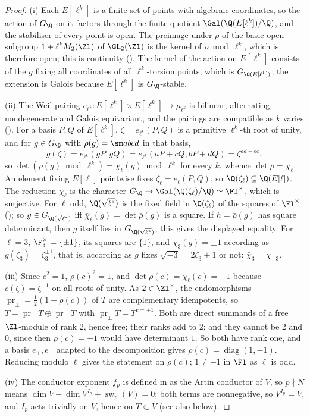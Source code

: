 \begin{proof}
(i) Each $E[\ell^k]$ is a finite set of points with algebraic coordinates, so the action of $G_\Q$ on it factors through the finite quotient
$\Gal(\Q(E[\ell^k])/\Q)$, and the stabiliser of every point is open. The preimage under $\rho$ of the basic open subgroup $1+\ell^kM_2(\Zl)$ of $\GL_2(\Zl)$ is the kernel of $\rho\bmod\ell^k$, which is
therefore open; this is continuity (). The kernel of the action on
$E[\ell^k]$ consists of the $g$ fixing all coordinates of all $\ell^k$-torsion points, which is $G_{\Q(E[\ell^k])}$; the extension is Galois because
$E[\ell^k]$ is $G_\Q$-stable.

(ii) The Weil pairing $e_{\ell^k}\colon E[\ell^k]\times E[\ell^k]\to\mu_{\ell^k}$ is bilinear, alternating, nondegenerate and Galois equivariant, and the
pairings are compatible as $k$ varies (). For a basis $P,Q$ of $E[\ell^k]$, $\zeta=e_{\ell^k}(P,Q)$ is a primitive $\ell^k$-th root
of unity, and for $g\in G_\Q$ with $\rho(g)=\sm abcd$ in that basis,
\[
g(\zeta)=e_{\ell^k}(gP,gQ)=e_{\ell^k}(aP+cQ,bP+dQ)=\zeta^{ad-bc},
\]
so $\det(\rho(g)\bmod\ell^k)=\chi_\ell(g)\bmod\ell^k$ for every $k$, whence $\det\rho=\chi_\ell$. An element fixing $E[\ell]$ pointwise fixes $\zeta_\ell=e_\ell(P,Q)$,
so $\Q(\zeta_\ell)\subseteq\Q(E[\ell])$. The reduction $\bar\chi_\ell$ is the character $G_\Q\to\Gal(\Q(\zeta_\ell)/\Q)\simeq\Fl^\times$, which is surjective. For $\ell$
odd, $\Q(\sqrt{\ell^*})$ is the fixed field in $\Q(\zeta_\ell)$ of the squares of $\Fl^\times$ (); so $g\in G_{\Q(\sqrt{\ell^*})}$ iff
$\bar\chi_\ell(g)=\det\bar\rho(g)$ is a square. If $h=\bar\rho(g)$ has square determinant, then $g$ itself lies in $G_{\Q(\sqrt{\ell^*})}$; this gives the
displayed equality. For $\ell=3$, $\F_3^\times=\{\pm1\}$, its squares are $\{1\}$, and $\bar\chi_3(g)=\pm1$ according as $g(\zeta_3)=\zeta_3^{\pm1}$, that is,
according as $g$ fixes $\sqrt{-3}=2\zeta_3+1$ or not: $\bar\chi_3=\chi_{-3}$.

(iii) Since $c^2=1$, $\rho(c)^2=1$, and $\det\rho(c)=\chi_\ell(c)=-1$ because $c(\zeta)=\zeta^{-1}$ on all roots of unity. As $2\in\Zl^\times$, the
endomorphisms $\operatorname{pr}_\pm=\frac12(1\pm\rho(c))$ of $T$ are complementary idempotents, so $T=\operatorname{pr}_+T\oplus\operatorname{pr}_-T$ with $\operatorname{pr}_\pm T=T^{c=\pm1}$. Both are direct
summands of a free $\Zl$-module of rank $2$, hence free; their ranks add to $2$; and they cannot be $2$ and $0$, since then $\rho(c)=\pm1$ would
have determinant $1$. So both have rank one, and a basis $e_+,e_-$ adapted to the decomposition gives $\rho(c)=\operatorname{diag}(1,-1)$. Reducing
modulo $\ell$ gives the statement on $\bar\rho(c)$; $1\ne-1$ in $\Fl$ as $\ell$ is odd.

(iv) The conductor exponent $f_p$ is defined in  as the Artin conductor of $V$, so $p\nmid N$ means
$\dim V-\dim V^{I_p}+\operatorname{sw}_p(V)=0$; both terms are nonnegative, so $V^{I_p}=V$, and $I_p$ acts trivially on $V$, hence on $T\subset V$
(see also  below).
\end{proof}

